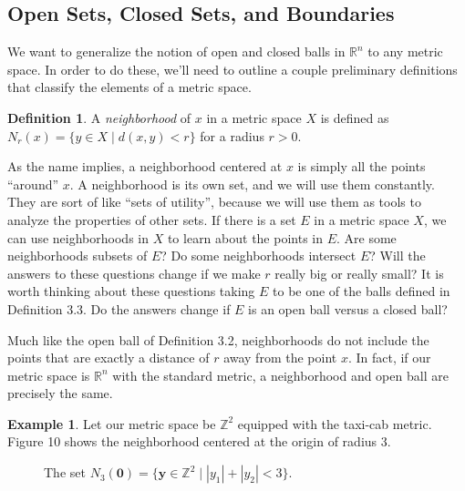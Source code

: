 \documentclass{article}
\newcommand{\R}{\mathbb{R}}
\newcommand{\y}{\mathbf{y}}
\newcommand{\Z}{\mathbb{Z}}
\theoremstyle{definition}
\newtheorem{definition}{Definition}[section]
\newtheorem{example}{Example}[section]
\begin{document}
\subsection{Open Sets, Closed Sets, and Boundaries}
We want to generalize the notion of open and closed balls in $ \R^n $ to any metric space. In order to do these, we'll need to outline a couple preliminary definitions that classify the elements of a metric space. 
\begin{definition}
	A \textit{\color{red}neighborhood } of $ x $ in a metric space $ X $ is defined as $ N_r(x)=\{y\in X\mid d(x,y)<r\} $ for a radius $ r>0 $.  
\end{definition}
As the name implies, a neighborhood centered at $ x $ is simply all the points ``around'' $ x $. A neighborhood is its own set, and we will use them constantly. They are sort of like ``sets of utility'', because we will use them as tools to analyze the properties of other sets. If there is a set $ E $ in a metric space $ X $, we can use neighborhoods in $ X $ to learn about the points in $ E $. Are some neighborhoods subsets of $ E $? Do some neighborhoods intersect $ E $? Will the answers to these questions change if we make $ r $ really big or really small? It is worth thinking about these questions taking $ E $ to be one of the balls defined in Definition 3.3. Do the answers change if $ E $ is an open ball versus a closed ball? 

 Much like the open ball of Definition 3.2, neighborhoods do not include the points that are exactly a distance of $ r $ away from the point $ x $. In fact, if our metric space is $ \R^n $ with the standard metric, a neighborhood and open ball are precisely the same. 
\begin{example}
	Let our metric space be $ \Z^2 $ equipped with the taxi-cab metric. Figure 10 shows the neighborhood centered at the origin of radius 3. 
		\begin{figure}[h]
		\centering
		\caption{The set $ N_{3}(\mathbf{0})=\{\y\in\Z^2\mid|y_1|+|y_2|<3 \} $.}
	\end{figure}
\end{example} 
 
\end{document}
